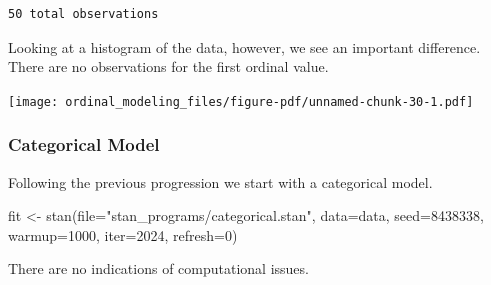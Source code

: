 \documentclass[
  letterpaper,
  DIV=11,
  numbers=noendperiod]{scrartcl}
\newenvironment{Shaded}{\begin{snugshade}}{\end{snugshade}}
\newcommand{\AttributeTok}[1]{\textcolor[rgb]{0.40,0.45,0.13}{#1}}
\newcommand{\DecValTok}[1]{\textcolor[rgb]{0.68,0.00,0.00}{#1}}
\newcommand{\FloatTok}[1]{\textcolor[rgb]{0.68,0.00,0.00}{#1}}
\newcommand{\FunctionTok}[1]{\textcolor[rgb]{0.28,0.35,0.67}{#1}}
\newcommand{\NormalTok}[1]{\textcolor[rgb]{0.00,0.23,0.31}{#1}}
\newcommand{\OtherTok}[1]{\textcolor[rgb]{0.00,0.23,0.31}{#1}}
\newcommand{\SpecialCharTok}[1]{\textcolor[rgb]{0.37,0.37,0.37}{#1}}
\newcommand{\StringTok}[1]{\textcolor[rgb]{0.13,0.47,0.30}{#1}}
\begin{document}
\begin{verbatim}
50 total observations
\end{verbatim}

Looking at a histogram of the data, however, we see an important
difference. There are no observations for the first ordinal value.

\begin{Shaded}
\end{Shaded}

\texttt{[image: ordinal\_modeling\_files/figure-pdf/unnamed-chunk-30-1.pdf]}

\subsubsection{Categorical Model}\label{categorical-model-1}

Following the previous progression we start with a categorical model.

\begin{Shaded}
\begin{Highlighting}[]
\NormalTok{fit }\OtherTok{\textless{}{-}} \FunctionTok{stan}\NormalTok{(}\AttributeTok{file=}\StringTok{"stan\_programs/categorical.stan"}\NormalTok{,}
            \AttributeTok{data=}\NormalTok{data, }\AttributeTok{seed=}\DecValTok{8438338}\NormalTok{,}
            \AttributeTok{warmup=}\DecValTok{1000}\NormalTok{, }\AttributeTok{iter=}\DecValTok{2024}\NormalTok{, }\AttributeTok{refresh=}\DecValTok{0}\NormalTok{)}
\end{Highlighting}
\end{Shaded}

There are no indications of computational issues.

\begin{Shaded}
\end{Shaded}
\end{document}
